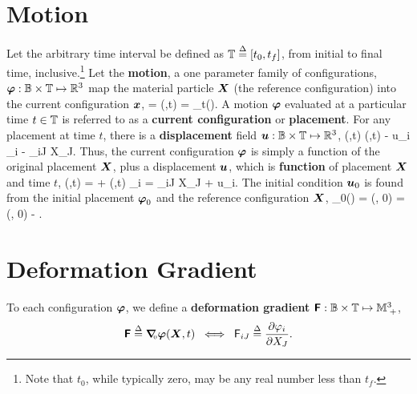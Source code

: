 \section{Motion}
Let the arbitrary time interval be defined as $\mathbb{T} \stackrel{\Delta}{=} [t_0,t_f]$, from initial to final time, inclusive.\footnote{Note that $t_0$, while typically zero, may be any real number less than $t_f$.}  Let the {\bf motion}, a one parameter family of configurations, $\mbox{\boldmath $\varphi$} : \mathbb{B} \times \mathbb{T} \mapsto \mathbb{R}^3$ map the material particle $\mbox{\boldmath $X$}$ (the reference configuration) into the current configuration $\mbox{\boldmath $x$}$,
\be
\vx = \vvarphi(\vX,t) = \vvarphi_t(\vX).
\label{eq:motion}
\ee
A motion $\mbox{\boldmath $\varphi$}$ evaluated at a particular time $t \in \mathbb{T}$ is referred to as a {\bf current configuration} or {\bf placement}.  For any placement at time $t$, there is a {\bf displacement} field $\mbox{\boldmath $u$}: \mathbb{B} \times \mathbb{T} \mapsto \mathbb{R}^3$,
\be
\vu(\vX,t)  \vvarphi(\vX,t) - \vX 
\;\;\Longleftrightarrow\;\;
u_i  \varphi_i - \delta_{iJ} X_J.
\label{eq:displacement}
\ee
Thus, the current configuration $\mbox{\boldmath $\varphi$}$ is simply a function of the original placement $\mbox{\boldmath $X$}$, plus a displacement $\mbox{\boldmath $u$}$, which is {\bf function} of placement $\mbox{\boldmath $X$}$ and time $t$,
\be
\vvarphi(\vX,t) = \vX + \vu(\vX,t)
\;\; \Longleftrightarrow \;\;
\varphi_i = \delta_{iJ} X_J + u_i.
\label{eq:displacement_vvarphi}
\ee
The initial condition $\mbox{\boldmath $u$}_0$ is found from the initial placement $\mbox{\boldmath $\varphi$}_0$ and the reference configuration $\mbox{\boldmath $X$}$,
\be
\vu_0(\vX) = \vu(\vX, 0) = \vvarphi(\vX, 0) - \vX.
\ee
%

\section{Deformation Gradient}
To each configuration $\mbox{\boldmath $\varphi$}$, we define a {\bf deformation gradient} $\mbox{\sffamily\bfseries F}: \mathbb{B} \times \mathbb{T} \mapsto \mathbb{M}^{3}_{\; +}$, 
\begin{equation}
\mbox{\sffamily\bfseries F} 
\stackrel{\Delta}{=} 
\mbox{\boldmath $\nabla$}_{\hspace{-1mm}\mbox{\tiny 0}} \mbox{\boldmath $\varphi$}(\mbox{\boldmath $X$}, t)
\;\; \Longleftrightarrow \;\;
\mathsf F_{iJ} 
\stackrel{\Delta}{=} 
\frac{\partial \varphi_i}{\partial X_J}.
\label{eq:deformation_gradient}
\end{equation}

